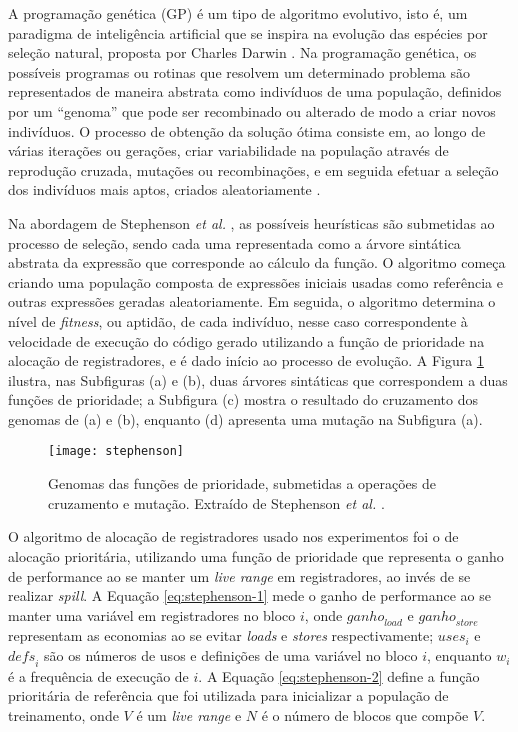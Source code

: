 \documentclass[
	12pt,				%
	openright,			%
	oneside,			%
	a4paper,			%
	tccpreliminar,			%
	]{ABNT-DC-UEL}
\begin{document}
A programação genética (GP) é um tipo de algoritmo evolutivo, isto é, um paradigma de inteligência artificial que se inspira na evolução das espécies por seleção natural, proposta por Charles Darwin \cite{darwin:59}. Na programação genética, os possíveis programas ou rotinas que resolvem um determinado problema são representados de maneira abstrata como indivíduos de uma população, definidos por um ``genoma'' que pode ser recombinado ou alterado de modo a criar novos indivíduos. O processo de obtenção da solução ótima consiste em, ao longo de várias iterações ou gerações, criar variabilidade na população através de reprodução cruzada, mutações ou recombinações, e em seguida efetuar a seleção dos indivíduos mais aptos, criados aleatoriamente \cite{koza:94}.

Na abordagem de Stephenson \textit{et al.} \cite{amarasinghe:03}, as possíveis heurísticas são submetidas ao processo de seleção, sendo cada uma representada como a árvore sintática abstrata da expressão que corresponde ao cálculo da função. O algoritmo começa criando uma população composta de expressões iniciais usadas como referência e outras expressões geradas aleatoriamente. Em seguida, o algoritmo determina o nível de \textit{fitness}, ou aptidão, de cada indivíduo, nesse caso correspondente à velocidade de execução do código gerado utilizando a função de prioridade na alocação de registradores, e é dado início ao processo de evolução. A Figura \ref{fig:stephenson} ilustra, nas Subfiguras (a) e (b), duas árvores sintáticas que correspondem a duas funções de prioridade; a Subfigura (c) mostra o resultado do cruzamento dos genomas de (a) e (b), enquanto (d) apresenta uma mutação na Subfigura (a).

\begin{figure}[hbt]
    \centering
    \texttt{[image: stephenson]}
    \caption{Genomas das funções de prioridade, submetidas a operações de cruzamento e mutação. Extraído de Stephenson \textit{et al.} \cite{amarasinghe:03}.}
    \label{fig:stephenson}
\end{figure}

O algoritmo de alocação de registradores usado nos experimentos foi o de alocação prioritária, utilizando uma função de prioridade que representa o ganho de performance ao se manter um \textit{live range} em registradores, ao invés de se realizar \textit{spill}. A Equação \ref{eq:stephenson-1} mede o ganho de performance ao se manter uma variável em registradores no bloco $i$, onde $\mathit{ganho}_\textit{load}$ e $\mathit{ganho}_\textit{store}$ representam as economias ao se evitar \textit{loads} e \textit{stores} respectivamente; $\mathit{uses}_i$ e $\mathit{defs}_i$ são os números de usos e definições de uma variável no bloco $i$, enquanto $w_i$ é a frequência de execução de $i$. A Equação \ref{eq:stephenson-2} define a função prioritária de referência que foi utilizada para inicializar a população de treinamento, onde $V$ é um \textit{live range} e $N$ é o número de blocos que compõe $V$.
\end{document}
